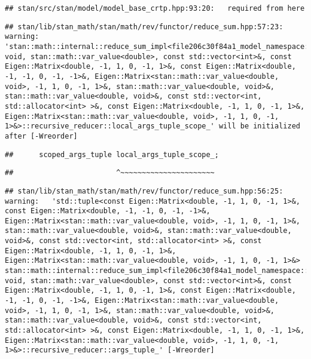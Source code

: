 \documentclass[
]{article}
\begin{document}
\begin{verbatim}
## stan/src/stan/model/model_base_crtp.hpp:93:20:   required from here
\end{verbatim}

\begin{verbatim}
## stan/lib/stan_math/stan/math/rev/functor/reduce_sum.hpp:57:23: warning: 'stan::math::internal::reduce_sum_impl<file206c30f84a1_model_namespace::partial_log_lik_rsfunctor__, void, stan::math::var_value<double>, const std::vector<int>&, const Eigen::Matrix<double, -1, 1, 0, -1, 1>&, const Eigen::Matrix<double, -1, -1, 0, -1, -1>&, Eigen::Matrix<stan::math::var_value<double, void>, -1, 1, 0, -1, 1>&, stan::math::var_value<double, void>&, stan::math::var_value<double, void>&, const std::vector<int, std::allocator<int> >&, const Eigen::Matrix<double, -1, 1, 0, -1, 1>&, Eigen::Matrix<stan::math::var_value<double, void>, -1, 1, 0, -1, 1>&>::recursive_reducer::local_args_tuple_scope_' will be initialized after [-Wreorder]
\end{verbatim}

\begin{verbatim}
##      scoped_args_tuple local_args_tuple_scope_;
\end{verbatim}

\begin{verbatim}
##                        ^~~~~~~~~~~~~~~~~~~~~~~
\end{verbatim}

\begin{verbatim}
## stan/lib/stan_math/stan/math/rev/functor/reduce_sum.hpp:56:25: warning:   'std::tuple<const Eigen::Matrix<double, -1, 1, 0, -1, 1>&, const Eigen::Matrix<double, -1, -1, 0, -1, -1>&, Eigen::Matrix<stan::math::var_value<double, void>, -1, 1, 0, -1, 1>&, stan::math::var_value<double, void>&, stan::math::var_value<double, void>&, const std::vector<int, std::allocator<int> >&, const Eigen::Matrix<double, -1, 1, 0, -1, 1>&, Eigen::Matrix<stan::math::var_value<double, void>, -1, 1, 0, -1, 1>&> stan::math::internal::reduce_sum_impl<file206c30f84a1_model_namespace::partial_log_lik_rsfunctor__, void, stan::math::var_value<double>, const std::vector<int>&, const Eigen::Matrix<double, -1, 1, 0, -1, 1>&, const Eigen::Matrix<double, -1, -1, 0, -1, -1>&, Eigen::Matrix<stan::math::var_value<double, void>, -1, 1, 0, -1, 1>&, stan::math::var_value<double, void>&, stan::math::var_value<double, void>&, const std::vector<int, std::allocator<int> >&, const Eigen::Matrix<double, -1, 1, 0, -1, 1>&, Eigen::Matrix<stan::math::var_value<double, void>, -1, 1, 0, -1, 1>&>::recursive_reducer::args_tuple_' [-Wreorder]
\end{verbatim}
\end{document}
